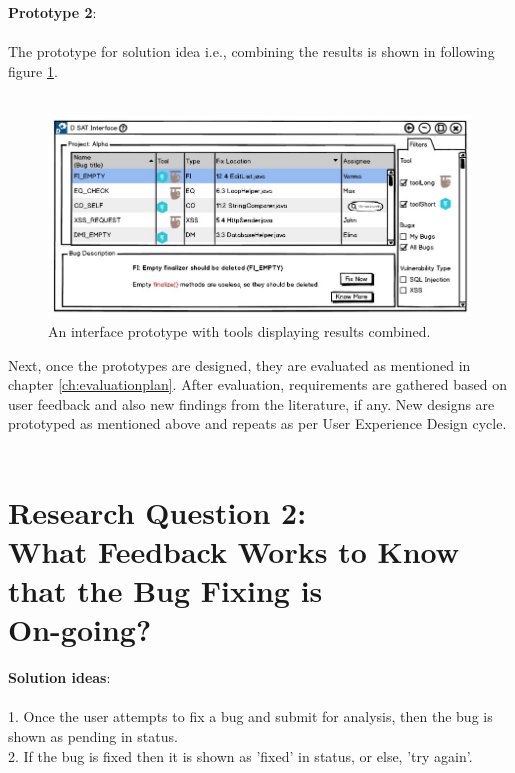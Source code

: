 \textbf{Prototype 2}: \\ \\

The prototype for solution idea i.e., combining the results is shown in following figure \ref{fig:toolCombine}. \\ \\

\begin{figure}[hbt!]
	\centering
	\includegraphics[width=\linewidth]{figures/d_combine}
	\caption{An interface prototype with tools displaying results combined.}
	\label{fig:toolCombine}
\end{figure}

Next, once the prototypes are designed, they are evaluated as mentioned in chapter \ref{ch:evaluationplan}. After evaluation, requirements are gathered based on user feedback and also new findings from the literature, if any. New designs are prototyped as mentioned above and repeats as per User Experience Design cycle. \\ \\

\section{Research Question 2: \\ What Feedback Works to Know that the Bug Fixing is \\ On-going?} 

\textbf{Solution ideas}: \\ \\
1. Once the user attempts to fix a bug and submit for analysis, then the bug is shown as pending in status. \\
2. If the bug is fixed then it is shown as 'fixed' in status, or else, 'try again'. \\ \\

